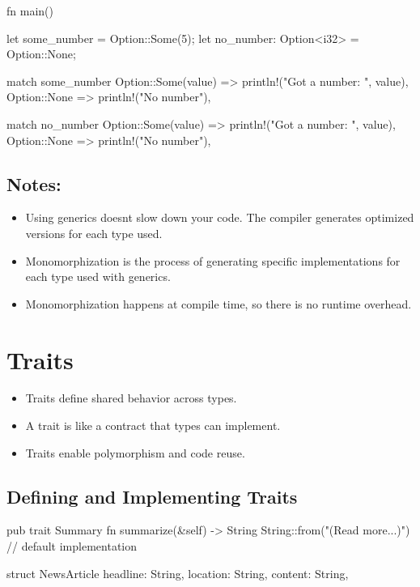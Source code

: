 \documentclass[8pt,a4paper,twocolumn]{extarticle}
\begin{document}
\begin{Code}
\begin{Code}
  fn main() {
      let some_number = Option::Some(5);
      let no_number: Option<i32> = Option::None;
      
      match some_number {
          Option::Some(value) => println!("Got a number: {}", value),
          Option::None => println!("No number"),
      }
      
      match no_number {
          Option::Some(value) => println!("Got a number: {}", value),
          Option::None => println!("No number"),
      }
  }
\end{Code}

\subsection{Notes:}
\begin{itemize}
  \item Using generics doesnt slow down your code. The compiler generates optimized versions for each type used.
  \item Monomorphization is the process of generating specific implementations for each type used with generics.
  \item Monomorphization happens at compile time, so there is no runtime overhead.
\end{itemize}



\section{Traits}

\begin{itemize}
  \item Traits define shared behavior across types.
  \item A trait is like a contract that types can implement.
  \item Traits enable polymorphism and code reuse.
\end{itemize}

\subsection{Defining and Implementing Traits}
\begin{Code}
  pub trait Summary {
      fn summarize(&self) -> String {
          String::from("(Read more...)") // default implementation
      }
  }

  struct NewsArticle {
      headline: String,
      location: String,
      content: String,
  }


\end{Code}
\end{Code}
\end{document}
